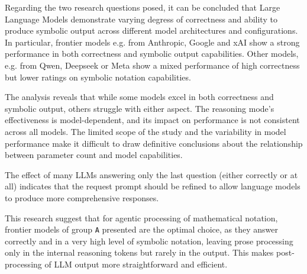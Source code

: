 
Regarding the two research questions posed, it can be concluded that Large Language Models demonstrate varying degress
of correctness and ability to produce symbolic output across different model architectures and configurations. In particular, frontier models 
e.g. from Anthropic, Google and xAI show a strong performance in both correctness and symbolic output capabilities. 
Other models, e.g. from Qwen, Deepseek or Meta show a mixed performance of high correctness but lower ratings on symbolic notation capabilities.

\medskip

The analysis reveals that while some models excel in both correctness and symbolic output, others struggle with either aspect. 
The reasoning mode's effectiveness is model-dependent, and its impact on performance is not consistent across all models. 
The limited scope of the study and the variability in model performance make it difficult to draw 
definitive conclusions about the relationship between parameter count and model capabilities. 

\medskip

The effect of many LLMs answering only the last question (either correctly or at all) indicates that the request prompt should be refined
to allow language models to produce more comprehensive responses.

\medskip

This research suggest that for agentic processing of mathematical notation, frontier models of group \texttt{A} presented are the optimal choice, 
as they answer correctly and in a very high level of symbolic notation, leaving prose processing only in the internal reasoning tokens but rarely in the
output. This makes post-processing of LLM output more straightforward and efficient.